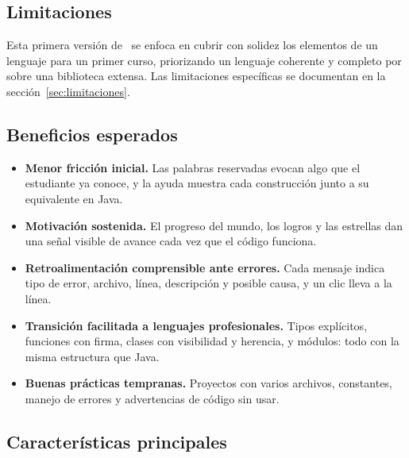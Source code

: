 \subsection{Limitaciones}

Esta primera versión de \ggez\ se enfoca en cubrir con solidez los elementos de un lenguaje para un primer curso, priorizando un lenguaje coherente y completo por sobre una biblioteca extensa. Las limitaciones específicas se documentan en la sección~\ref{sec:limitaciones}.

\subsection{Beneficios esperados}

\begin{itemize}
  \item \textbf{Menor fricción inicial.} Las palabras reservadas evocan algo que el estudiante ya conoce, y la ayuda muestra cada construcción junto a su equivalente en Java.
  \item \textbf{Motivación sostenida.} El progreso del mundo, los logros y las estrellas dan una señal visible de avance cada vez que el código funciona.
  \item \textbf{Retroalimentación comprensible ante errores.} Cada mensaje indica tipo de error, archivo, línea, descripción y posible causa, y un clic lleva a la línea.
  \item \textbf{Transición facilitada a lenguajes profesionales.} Tipos explícitos, funciones con firma, clases con visibilidad y herencia, y módulos: todo con la misma estructura que Java.
  \item \textbf{Buenas prácticas tempranas.} Proyectos con varios archivos, constantes, manejo de errores y advertencias de código sin usar.
\end{itemize}

\subsection{Características principales}

